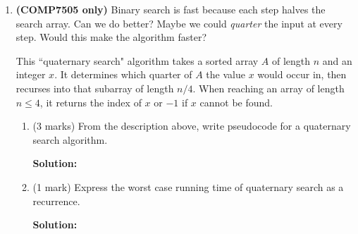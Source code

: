 \documentclass[a4,13pt]{extarticle}
\newenvironment{Solution}{\color{blue}\textbf{Solution:}}{}
\begin{document}
\begin{enumerate}
\begin{enumerate}
	      	      Write \textbf{pseudocode} for an algorithm to find the source while breaking at most $2$ drill bits, and give a tight Big-O 
	      	      bound on the number of squares drilled (in the worst case). If you use external function calls (e.g. to consult the hydrologist, 
	      	      or to see if the cell you drilled is the source) you should define these, their parameters, and their return values. \\\\
	      	      Your algorithm's time complexity should be as efficient as possible in order to receive marks. 
	      	      (Hint: A linear time algorithm is not efficient enough for full marks.)
	      	      
	      	\begin{Solution}
	      	\end{Solution}
	      	      	      	              
	      \end{enumerate}
	      	              
	      	              
	      \newpage 
	\item 
	      \textbf{(COMP7505 only)} Binary search is fast because each step halves the search array. Can we do better? 
	      Maybe we could \textit{quarter} the input at every step. Would this make the algorithm faster?
	      	      
	      This ``quaternary search" algorithm takes a sorted array $A$ of length $n$ and an integer $x$. 
	      It determines which quarter of $A$ the value $x$ would occur in, then recurses into that subarray of length $n/4$. 
	      When reaching an array of length $n\le 4$, it returns the index of $x$ or $-1$ if $x$ cannot be found.
	      	              
	      \begin{enumerate}
	      	\item (3 marks) From the description above, write pseudocode for a quaternary search algorithm.
	      	
	      	\begin{Solution}
	      	\end{Solution}
	      	
	      	\item (1 mark) Express the worst case running time of quaternary search as a recurrence.
	      	
	      	
	      	\begin{Solution}
	      	\end{Solution}
	      	

\end{enumerate}
\end{enumerate}
\end{document}
